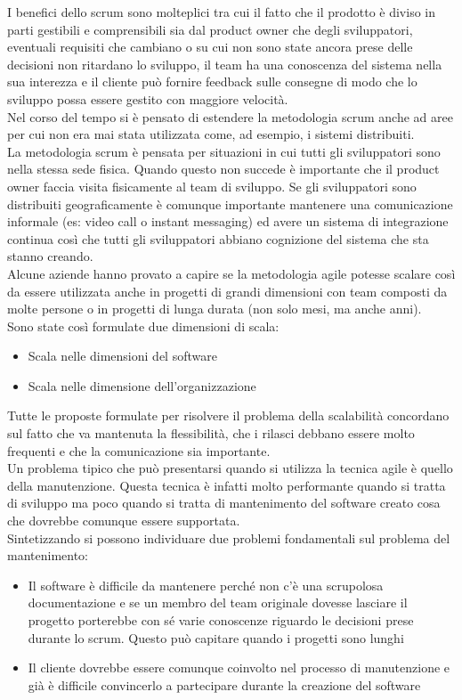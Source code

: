 I benefici dello scrum sono molteplici tra cui il fatto che il prodotto è diviso in parti gestibili e comprensibili sia dal product owner che degli sviluppatori, eventuali requisiti che cambiano o su cui non sono state ancora prese delle decisioni non ritardano lo sviluppo, il team ha una conoscenza del sistema nella sua interezza e il cliente può fornire feedback sulle consegne di modo che lo sviluppo possa essere gestito con maggiore velocità.\\
Nel corso del tempo si è pensato di estendere la metodologia scrum anche ad aree per cui non era mai stata utilizzata come, ad esempio, i sistemi distribuiti.\\
La metodologia scrum è pensata per situazioni in cui tutti gli sviluppatori sono nella stessa sede fisica.
Quando questo non succede è importante che il product owner faccia visita fisicamente al team di sviluppo.
Se gli sviluppatori sono distribuiti geograficamente è comunque importante mantenere una comunicazione informale (es: video call o instant messaging) ed avere un sistema di integrazione continua così che tutti gli sviluppatori abbiano cognizione del sistema che sta stanno creando.\\
Alcune aziende hanno provato a capire se la metodologia agile potesse scalare così da essere utilizzata anche in progetti di grandi dimensioni con team composti da molte persone o in progetti di lunga durata (non solo mesi, ma anche anni).\\
Sono state così formulate due dimensioni di scala:
\begin{itemize}[noitemsep]
    \item Scala nelle dimensioni del software
    \item Scala nelle dimensione dell'organizzazione
\end{itemize}
Tutte le proposte formulate per risolvere il problema della scalabilità concordano sul fatto che va mantenuta la flessibilità, che i rilasci debbano essere molto frequenti e che la comunicazione sia importante.\\
Un problema tipico che può presentarsi quando si utilizza la tecnica agile è quello della manutenzione.
Questa tecnica è infatti molto performante quando si tratta di sviluppo ma poco quando si tratta di mantenimento del software creato cosa che dovrebbe comunque essere supportata.\\
Sintetizzando si possono individuare due problemi fondamentali sul problema del mantenimento:
\begin{itemize}[noitemsep]
    \item Il software è difficile da mantenere perché non c'è una scrupolosa documentazione e se un membro del team originale dovesse lasciare il progetto porterebbe con sé varie conoscenze riguardo le decisioni prese durante lo scrum. Questo può capitare quando i progetti sono lunghi
    \item Il cliente dovrebbe essere comunque coinvolto nel processo di manutenzione e già è difficile convincerlo a partecipare durante la creazione del software
\end{itemize}
